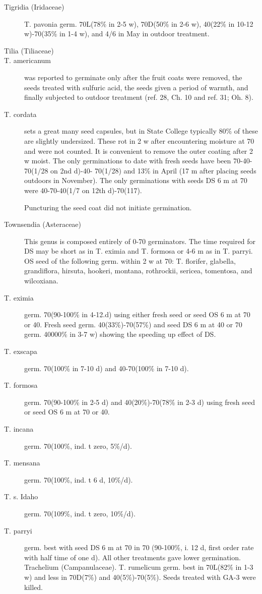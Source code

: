 \begin{description}
\item[Tigridia (Iridaceae)] T. pavonia germ. 70L(78\% in 2-5 w), 70D(50\% in 2-6
w), 40(22\% in 10-12 w)-70(35\% in 1-4 w), and 4/6 in May in outdoor treatment.
\item [Tilia (Tiliaceae)]
\item[T. americanum] was reported to germinate only after the fruit coats were
removed, the seeds treated with sulfuric acid, the seeds given a period of warmth, and
finally subjected to outdoor treatment (ref. 28, Ch. 10 and ref. 31; Oh. 8).
\item[T. cordata] sets a great many seed capsules, but in State College typically 80\%
of these are slightly undersized. These rot in 2 w after encountering moisture at 70 and
were not counted. It is convenient to remove the outer coating after 2 w moist. The
only germinations to date with fresh seeds have been 70-40-70(1/28 on 2nd d)-40-
70(1/28) and 13\% in April (17 m after placing seeds outdoors in November). The only
germinations with seeds DS 6 m at 70 were 40-70-40(1/7 on 12th d)-70(117).

Puncturing the seed coat did not initiate germination.

\item[Townsendia (Asteraceae)] This genus is composed entirely of 0-70
germinators. The time required for DS may be short as in T. eximia and T. formosa or
4-6 m as in T. parryi. OS seed of the following germ. within 2 w at 70: T. florifer,
glabella, grandiflora, hirsuta, hookeri, montana, rothrockii, sericea, tomentosa, and
wilcoxiana.

\item[T. eximia] germ. 70(90-100\% in 4-12.d) using either fresh seed or seed OS 6 m
at 70 or 40. Fresh seed germ. 40(33\%)-70(57\%) and seed DS 6 m at 40 or 70 germ.
40000\% in 3-7 w) showing the speeding up effect of DS.
\item[T. exscapa] germ. 70(100\% in 7-10 d) and 40-70(100\% in 7-10 d).
\item[T. formosa] germ. 70(90-100\% in 2-5 d) and 40(20\%)-70(78\% in 2-3 d) using
fresh seed or seed OS 6 m at 70 or 40.
\item[T. incana] germ. 70(100\%, ind. t zero, 5\%/d).
\item[T. mensana] germ. 70(100\%, ind. t 6 d, 10\%/d).

\item[T. s. Idaho] germ. 70(109\%, ind. t zero, 10\%/d).
\item[T. parryi] germ. best with seed DS 6 m at 70 in 70 (90-100\%, i. 12 d, first order
rate with half time of one d). All other treatments gave lower germination.
Trachelium (Campanulaceae). T. rumelicum germ. best in 70L(82\% in 1-3
w) and less in 70D(7\%) and 40(5\%)-70(5\%). Seeds treated with GA-3 were killed.


\end{description}
